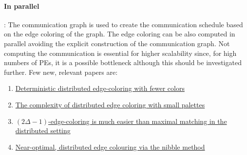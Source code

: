 \documentclass[a4paper,10pt]{article}
\begin{document}
\paragraph*{In parallel}: The communication graph is used to create the communication schedule
based on the edge coloring of the graph. The edge coloring can be also computed in parallel
avoiding the explicit construction of the communication graph. Not computing the communication
is essential for higher scalability since, for high numbers of PEs, it is a possible bottleneck although
this should be investigated further. Few new, relevant papers are:
\begin{enumerate}
\item \href{https://dl.acm.org/citation.cfm?id=3188906}
{Deterministic distributed edge-coloring with fewer colors}

\item \href{https://dl.acm.org/citation.cfm?id=3175473}
{The complexity of distributed edge coloring with small palettes}

\item \href{https://dl.acm.org/citation.cfm?id=2722155}
{$(2\Delta -1)$-edge-coloring is much easier than maximal matching in the distributed setting}

\item \href{https://dl.acm.org/citation.cfm?id=282804}
{Near-optimal, distributed edge colouring via the nibble method}

\end{enumerate}
\end{document}
